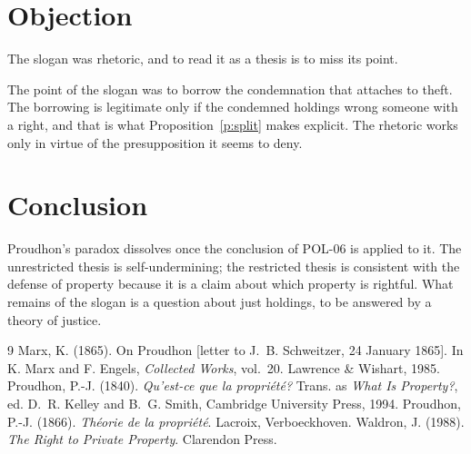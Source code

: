 \documentclass{situationist-preprint}
\begin{document}
\section{Objection}

\begin{objection}
The slogan was rhetoric, and to read it as a thesis is to miss its point.
\end{objection}

\begin{reply}
The point of the slogan was to borrow the condemnation that attaches to theft. The borrowing is legitimate only if the condemned holdings wrong someone with a right, and that is what Proposition~\ref{p:split} makes explicit. The rhetoric works only in virtue of the presupposition it seems to deny.
\end{reply}

\section{Conclusion}

Proudhon's paradox dissolves once the conclusion of POL-06 is applied to it. The unrestricted thesis is self-undermining; the restricted thesis is consistent with the defense of property because it is a claim about which property is rightful. What remains of the slogan is a question about just holdings, to be answered by a theory of justice.

\begin{thebibliography}{9}
 Marx, K. (1865). On Proudhon [letter to J.~B. Schweitzer, 24 January 1865]. In K. Marx and F. Engels, \emph{Collected Works}, vol.~20. Lawrence \& Wishart, 1985.
 Proudhon, P.-J. (1840). \emph{Qu'est-ce que la propri\'et\'e?} Trans. as \emph{What Is Property?}, ed. D.~R. Kelley and B.~G. Smith, Cambridge University Press, 1994.
 Proudhon, P.-J. (1866). \emph{Th\'eorie de la propri\'et\'e}. Lacroix, Verboeckhoven.
 Waldron, J. (1988). \emph{The Right to Private Property}. Clarendon Press.
\end{thebibliography}
\end{document}
